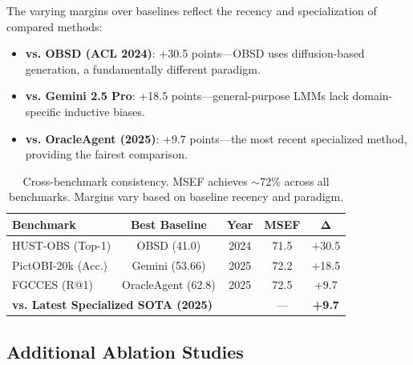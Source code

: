 \documentclass{article}
\begin{document}
The varying margins over baselines reflect the recency and specialization of compared methods:
\begin{itemize}[leftmargin=*,itemsep=1pt]
\item \textbf{vs. OBSD (ACL 2024)}: +30.5 points---OBSD uses diffusion-based generation, a fundamentally different paradigm.
\item \textbf{vs. Gemini 2.5 Pro}: +18.5 points---general-purpose LMMs lack domain-specific inductive biases.
\item \textbf{vs. OracleAgent (2025)}: +9.7 points---the most recent specialized method, providing the fairest comparison.
\end{itemize}

\begin{table}[t]
\centering
\small
\caption{Cross-benchmark consistency. MSEF achieves $\sim$72\% across all benchmarks. Margins vary based on baseline recency and paradigm.}
\label{tab:cross_benchmark}
\begin{tabular}{lcccc}
\toprule
\textbf{Benchmark} & \textbf{Best Baseline} & \textbf{Year} & \textbf{MSEF} & $\boldsymbol{\Delta}$ \\
\midrule
HUST-OBS (Top-1) & OBSD (41.0) & 2024 & 71.5 & +30.5 \\
PictOBI-20k (Acc.) & Gemini (53.66) & 2025 & 72.2 & +18.5 \\
FGCCES (R@1) & OracleAgent (62.8) & 2025 & 72.5 & +9.7 \\
\midrule
\multicolumn{3}{l}{\textbf{vs. Latest Specialized SOTA (2025)}} & --- & \textbf{+9.7} \\
\bottomrule
\end{tabular}
\end{table}

\subsection{Additional Ablation Studies}
\label{app:ablation}
\end{document}
